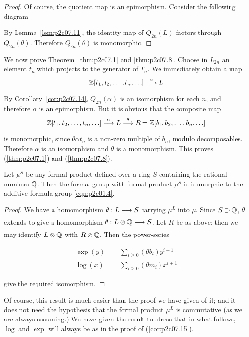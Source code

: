 \documentclass[../main]{subfiles}
\begin{document}
\begin{proof}
Of course, the quotient map is an epimorphism. Consider the following diagram

\begin{center}
\end{center}

By Lemma~\ref{lem:p2c07.11}, the identity map of $Q_{2n}(L)$ factors through $Q_{2n}(\theta)$. Therefore $Q_{2n}(\theta)$ is monomorphic.
\end{proof}

We now prove Theorem~\ref{thm:p2c07.1} and \ref{thm:p2c07.8}. Choose in $L_{2n}$ an element $t_n$ which projects to the generator of $T_n$. We immediately obtain a map \[\bbZ [t_1, t_2, \ldots, t_n, \ldots] \lar{\alpha} L\] By Corollary~\ref{cor:p2c07.14}, $Q_{2n}(\alpha)$ is an isomorphism for each $n$, and therefore $\alpha$ is an epimorphism. But it is obvious that the composite map \[\bbZ[t_1, t_2, \ldots, t_n, \ldots] \lar{\alpha} L \lar{\theta} R = \bbZ[b_1, b_2, \ldots, b_n, \ldots]\] is monomorphic, since $\theta \alpha t_n$ is a non-zero multiple of $b_n$, modulo decomposables. Therefore $\alpha$ is an isomorphism and $\theta$ is a monomorphism. This proves (\ref{thm:p2c07.1}) and (\ref{thm:p2c07.8}). 

\begin{customcor}{7.15}
\label{cor:p2c07.15}
Let $\mu^S$ be any formal product defined over a ring $S$ containing the rational numbers $\mathbb{Q}$. Then the formal group with formal product $\mu^S$ is isomorphic to the additive formula group \eqref{eqn:p2c01.4}.
\end{customcor}

\begin{proof}
We have a homomorphism $\theta : L \lar{} S$ carrying $\mu^L$ into $\mu$. Since $S \supset \mathbb{Q}$, $\theta$ extends to give a homomorphism $\theta : L \otimes \bbQ \lar{} S$. Let $R$ be as above; then we may identify $L \otimes \mathbb{Q}$ with $R \otimes \mathbb{Q}$. Then the power-series

\begin{align*}
\exp(y) & = \sum_{i \ge 0} (\theta b_i) y^{i + 1} \\ \log(x) & = \sum_{i \ge 0} (\theta m_i) x^{i + 1}
\end{align*}

give the required isomorphism.
\end{proof}

Of course, this result is much easier than the proof we have given of it; and it does not need the hypothesis that the formal product $\mu^L$ is commutative (as we are always assuming.) We have given the result to stress that in what follows, $\log$ and $\exp$ will always be as in the proof of (\ref{cor:p2c07.15}). 
\end{document}
